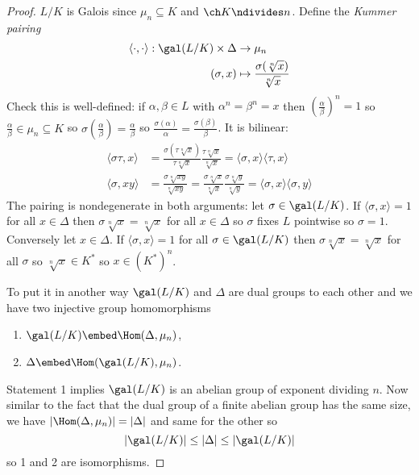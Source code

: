 \documentclass[a4paper]{article}
\theoremstyle{definition}
\begin{document}
\begin{proof}
  \(L/K\) is Galois since \(\mu_n \subseteq K\) and \(\ch K \ndivides n\). Define the \emph{Kummer pairing}
  \begin{align*}
    \langle \cdot , \cdot \rangle: \gal(L/K) \times \Delta &\to \mu_n \\
    (\sigma, x) &\mapsto \frac{\sigma(\sqrt[n]{x})}{\sqrt[n]{x}}
  \end{align*}
  Check this is well-defined: if \(\alpha, \beta \in L\) with \(\alpha^n = \beta^n = x\) then \((\frac{\alpha}{\beta})^n = 1\) so \(\frac{\alpha}{\beta} \in \mu_n \subseteq K\) so \(\sigma(\frac{\alpha}{\beta}) = \frac{\alpha}{\beta}\) so \(\frac{\sigma(\alpha)}{\alpha} = \frac{\sigma(\beta)}{\beta}\). It is bilinear:
  \begin{align*}
    \langle \sigma\tau, x \rangle
    &= \frac{\sigma(\tau \sqrt[n]{x})}{\tau \sqrt[n]x} \frac{\tau \sqrt[n]x}{\sqrt[n]x}
      = \langle \sigma, x \rangle \langle \tau, x \rangle \\
    \langle \sigma, xy \rangle
    &= \frac{\sigma \sqrt[n]{xy}}{\sqrt[n]{xy}}
      = \frac{\sigma \sqrt[n]x}{\sqrt[n]x} \frac{\sigma \sqrt[n]y}{\sqrt[n]y}
      = \langle \sigma, x\rangle \langle \sigma, y\rangle
  \end{align*}
  The pairing is nondegenerate in both arguments: let \(\sigma \in \gal(L/K)\). If \(\langle \sigma, x\rangle = 1\) for all \(x \in \Delta\) then \(\sigma \sqrt[n]x = \sqrt[n]x\) for all \(x \in \Delta\) so \(\sigma\) fixes \(L\) pointwise so \(\sigma = 1\). Conversely let \(x \in \Delta\). If \(\langle \sigma, x \rangle = 1\) for all \(\sigma \in \gal(L/K)\) then \(\sigma \sqrt[n]x = \sqrt[n]x\) for all \(\sigma\) so \(\sqrt[n]x \in K^*\) so \(x \in (K^*)^n\).

  To put it in another way \(\gal(L/K)\) and \(\Delta\) are dual groups to each other and we have two injective group homomorphisms
  \begin{enumerate}
  \item \(\gal(L/K) \embed \Hom(\Delta, \mu_n)\),
  \item \(\Delta \embed \Hom(\gal(L/K), \mu_n)\).
  \end{enumerate}
  Statement 1 implies \(\gal(L/K)\) is an abelian group of exponent dividing \(n\). Now similar to the fact that the dual group of a finite abelian group has the same size, we have \(|\Hom(\Delta, \mu_n)| = |\Delta|\) and same for the other so
  \[
    |\gal(L/K)| \leq |\Delta| \leq |\gal(L/K)|
  \]
  so 1 and 2 are isomorphisms.
\end{proof}
\end{document}

